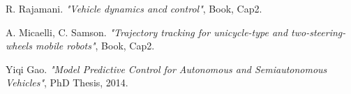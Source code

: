 \documentclass[12pt]{article}
\begin{document}
\newpage


\begin{thebibliography}{9}

    R. Rajamani.
    \textit{"Vehicle dynamics ancd control"}, Book, Cap2.

    A. Micaelli, C. Samson.
    \textit{"Trajectory tracking for unicycle-type and two-steering-wheels mobile robots"}, Book, Cap2.

    Yiqi Gao.
    \textit{"Model Predictive Control for Autonomous and Semiautonomous Vehicles"}, PhD Thesis, 2014.

    


    

    
\end{thebibliography}
\end{document}
